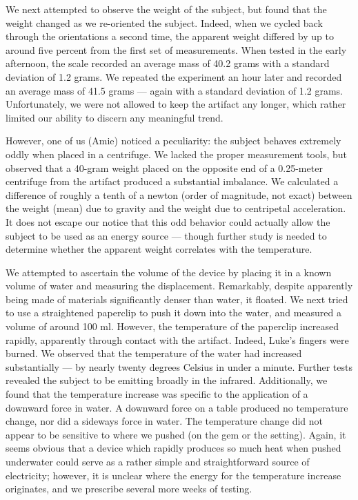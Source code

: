 \documentclass[10pt]{article}
\begin{document}
We next attempted to observe the weight of the subject, but found that the weight changed as we re-oriented the subject.
Indeed, when we cycled back through the orientations a second time, the apparent weight differed by up to around five percent from the first set of measurements.
When tested in the early afternoon, the scale recorded an average mass of 40.2 grams with a standard deviation of 1.2 grams.
We repeated the experiment an hour later and recorded an average mass of 41.5 grams --- again with a standard deviation of 1.2 grams.
Unfortunately, we were not allowed to keep the artifact any longer, which rather limited our ability to discern any meaningful trend.

However, one of us (Amie) noticed a peculiarity: the subject behaves extremely oddly when placed in a centrifuge.
We lacked the proper measurement tools, but observed that a 40-gram weight placed on the opposite end of a 0.25-meter centrifuge from the artifact produced a substantial imbalance.
We calculated a difference of roughly a tenth of a newton (order of magnitude, not exact) between the weight (mean) due to gravity and the weight due to centripetal acceleration.
It does not escape our notice that this odd behavior could actually allow the subject to be used as an energy source --- though further study is needed to determine whether the apparent weight correlates with the temperature.

We attempted to ascertain the volume of the device by placing it in a known volume of water and measuring the displacement.
Remarkably, despite apparently being made of materials significantly denser than water, it floated.
We next tried to use a straightened paperclip to push it down into the water, and measured a volume of around 100 ml.
However, the temperature of the paperclip increased rapidly, apparently through contact with the artifact. 
Indeed, Luke's fingers were burned.
We observed that the temperature of the water had increased substantially --- by nearly twenty degrees Celsius in under a minute.
Further tests revealed the subject to be emitting broadly in the infrared.
Additionally, we found that the temperature increase was specific to the application of a downward force in water.
A downward force on a table produced no temperature change, nor did a sideways force in water.
The temperature change did not appear to be sensitive to where we pushed (on the gem or the setting).
Again, it seems obvious that a device which rapidly produces so much heat when pushed underwater could serve as a rather simple and straightforward source of electricity; however, it is unclear where the energy for the temperature increase originates, and we prescribe several more weeks of testing.
\end{document}
